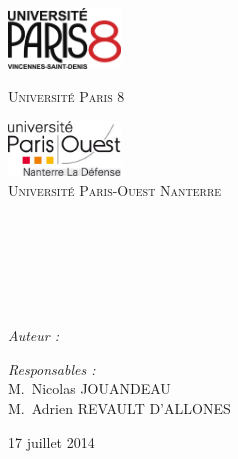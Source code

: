 \begin{titlepage}

\begin{center}

\begin{minipage}[t]{0.48\textwidth}
  \begin{flushleft}
    \includegraphics [width=30mm]{logop8.png} \\[0.5cm]
    \begin{spacing}{1.5}
      \textsc{Université Paris 8}
    \end{spacing}
  \end{flushleft}
\end{minipage}
\begin{minipage}[t]{0.48\textwidth}
  \begin{flushright}
    \includegraphics [width=30mm]{Paris-ouest-logo.png} \\[0.5cm]
    \textsc{Université Paris-Ouest Nanterre}
  \end{flushright}
\end{minipage} \\[1.5cm]

\textsc{\Large \reportsubject}\\[0.5cm]
\HRule \\[0.4cm]
{\huge \bfseries \reporttitle}\\[0.4cm]
\HRule \\[1.5cm]

\begin{minipage}[t]{0.3\textwidth}
  \begin{flushleft} \large
    \emph{Auteur :}\\
    \reportauthor
  \end{flushleft}
\end{minipage}
\begin{minipage}[t]{0.6\textwidth}
  \begin{flushright} \large
    \emph{Responsables :} \\
    M.~Nicolas \textsc{JOUANDEAU} \\
    M.~Adrien \textsc{REVAULT D'ALLONES}
  \end{flushright}
\end{minipage}

\vfill

{\large 17 juillet 2014}

\end{center}

\end{titlepage}
